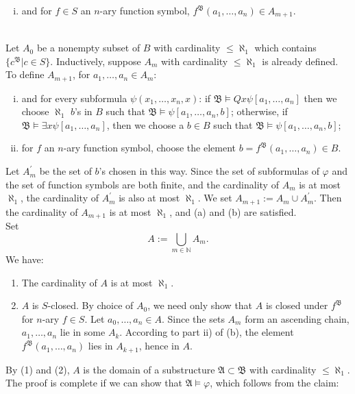 \begin{enumerate}[1.]
\begin{enumerate}[(a)]
\begin{enumerate}[i)]
\item and for $f \in S$ an $n$-ary function symbol, $f^{\mathfrak{B}}(a_1, \ldots, a_n) \in A_{m + 1}$.
\end{enumerate}
\end{enumerate}
\ 
\\
Let $A_0$ be a nonempty subset of $B$ with cardinality $\leq \aleph_1$ which contains $\{ c^\mathfrak{B} | c \in S \}$. Inductively, suppose $A_m$ with cardinality $\leq \aleph_1$ is already defined. To define $A_{m + 1}$, for $a_1, \ldots, a_n \in A_m$:
\begin{enumerate}[i)]
\item and for every subformula $\psi(x_1, \ldots, x_n, x)$: if $\mathfrak{B} \models Qx \psi[a_1, \ldots, a_n]$ then we choose $\aleph_1$ $b$'s in $B$ such that $\mathfrak{B} \models \psi[a_1, \ldots, a_n, b]$; otherwise, if $\mathfrak{B} \models \exists x \psi[a_1, \ldots, a_n]$, then we choose a $b \in B$ such that $\mathfrak{B} \models \psi[a_1, \ldots, a_n, b]$; 
\item for $f$ an $n$-ary function symbol, choose the element $b = f^{\mathfrak{B}}(a_1, \ldots, a_n) \in B$.
\end{enumerate}
Let $A_m^\prime$ be the set of $b$'s chosen in this way. Since the set of subformulas of $\varphi$ and the set of function symbols are both finite, and the cardinality of $A_m$ is at most $\aleph_1$, the cardinality of $A_m^\prime$ is also at most $\aleph_1$. We set $A_{m + 1} := A_m \cup A_m^\prime$. Then the cardinality of $A_{m + 1}$ is at most $\aleph_1$, and (a) and (b) are satisfied.\newline
\ 
\\Set
\[
A := \bigcup_{m \in \mathbb{N}} A_m.
\]
We have:
\begin{enumerate}[(1)]
\item The cardinality of $A$ is at most $\aleph_1$.
\item $A$ is $S$-closed. By choice of $A_0$, we need only show that $A$ is closed under $f^{\mathfrak{B}}$ for $n$-ary $f \in S$. Let $a_0, \ldots, a_n \in A$. Since the sets $A_m$ form an ascending chain, $a_1, \ldots, a_n$ lie in some $A_k$. According to part ii) of (b), the element $f^{\mathfrak{B}}(a_1, \ldots, a_n)$ lies in $A_{k + 1}$, hence in $A$. 
\end{enumerate}
By (1) and (2), $A$ is the domain of a substructure $\mathfrak{A} \subset \mathfrak{B}$ with cardinality $\leq \aleph_1$. The proof is complete if we can show that $\mathfrak{A} \models \varphi$, which follows from the claim:\newline

\end{enumerate}

